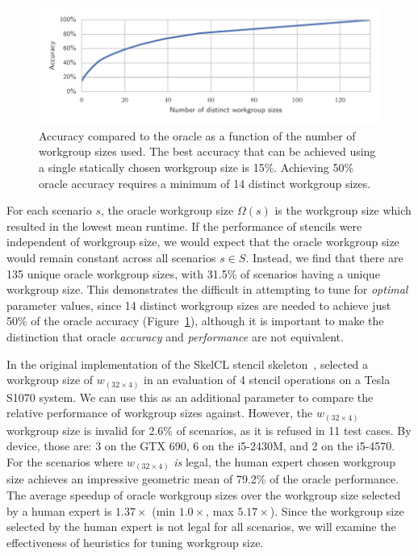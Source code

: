 \documentclass[nonatbib,preprint,9pt]{sigplanconf}
\begin{document}
\begin{figure}
\centering
\includegraphics[width=\columnwidth]{img/num_params_oracle.pdf}
\caption[Oracle accuracy vs.\ number of workgroup sizes]{%
  Accuracy compared to the oracle as a function of the number of
  workgroup sizes used. The best accuracy that can be achieved using a
  single statically chosen workgroup size is 15\%. Achieving 50\%
  oracle accuracy requires a minimum of 14 distinct workgroup sizes.%
}
\label{fig:oracle-accuracy}
\end{figure}

For each scenario $s$, the oracle workgroup size $\Omega(s)$ is the
workgroup size which resulted in the lowest mean runtime. If the
performance of stencils were independent of workgroup size, we would
expect that the oracle workgroup size would remain constant across all
scenarios $s \in S$. Instead, we find that there are 135 unique oracle
workgroup sizes, with 31.5\% of scenarios having a unique workgroup
size. This demonstrates the difficult in attempting to tune for
\emph{optimal} parameter values, since 14 distinct workgroup sizes are
needed to achieve just 50\% of the oracle accuracy
(Figure~\ref{fig:oracle-accuracy}), although it is important to make
the distinction that oracle \emph{accuracy} and \emph{performance} are
not equivalent.

In the original implementation of the SkelCL stencil
skeleton~\cite{Breuer2013}, \citeauthor{Breuer2013} selected a
workgroup size of $w_{(32 \times 4)}$ in an evaluation of 4 stencil
operations on a Tesla S1070 system. We can use this as an additional
parameter to compare the relative performance of workgroup sizes
against. However, the $w_{(32 \times 4)}$ workgroup size is invalid
for 2.6\% of scenarios, as it is refused in 11 test cases. By device,
those are: 3 on the GTX 690, 6 on the i5-2430M, and 2 on the i5-4570.
For the scenarios where $w_{(32 \times 4)}$ \emph{is} legal, the human
expert chosen workgroup size achieves an impressive geometric mean of
79.2\% of the oracle performance. The average speedup of oracle
workgroup sizes over the workgroup size selected by a human expert is
$1.37\times$ (min $1.0\times$, max $5.17\times$). Since the workgroup
size selected by the human expert is not legal for all scenarios, we
will examine the effectiveness of heuristics for tuning workgroup
size.
\end{document}
